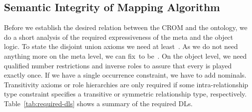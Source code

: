 
\subsection{Semantic Integrity of Mapping Algorithm}
\label{sec:sem-integ-mapping}

Before we establish the desired relation between the CROM and the ontology, we do a short analysis
of the required expressiveness of the meta and the object logic. To state the disjoint union axioms
we need at least~\ALC. As we do not need anything more on the meta level, we can fix~\LM to
be~\ALC. On the object level, we need qualified number restrictions and inverse roles to assure that
every \rosirole is played exactly once.
If we have a single occurrence constraint, we have to add nominals. Transitivity axioms or role
hierarchies are only required if some intra-relationship type constraint specifies a transitive or
symmetric relationship type, respectively. Table~\ref{tab:required-dls} shows a summary of the
required DLs.

